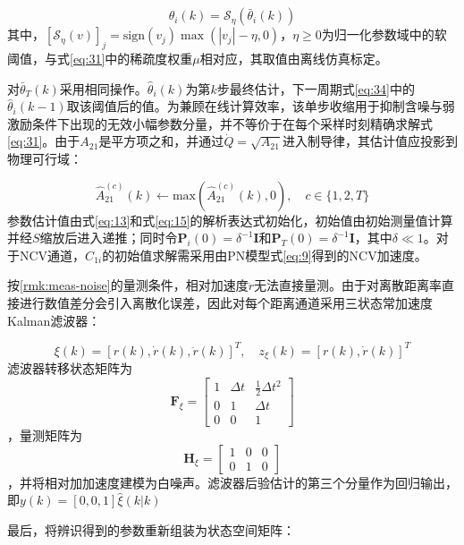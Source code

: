 \begin{equation}
\label{eq:36}
\hat{\theta}_{i}(k) = {\mathcal{S}_\eta }(\bar{\theta}_{i}(k))
\end{equation}
其中，${[{\mathcal{S}_\eta }(v)]_j} = {\text{sign}}({v_j})\max (|{v_j}| - \eta ,0)$，$\eta  \geqslant 0$为归一化参数域中的软阈值，与式\eqref{eq:31}中的稀疏度权重$\mu $相对应，其取值由离线仿真标定。

对$\bar{\theta}_{T}(k)$采用相同操作。$\hat{\theta}_{i}(k)$为第$k$步最终估计，下一周期式\eqref{eq:34}中的$\hat{\theta}_{i}(k - 1)$取该阈值后的值。为兼顾在线计算效率，该单步收缩用于抑制含噪与弱激励条件下出现的无效小幅参数分量，并不等价于在每个采样时刻精确求解式\eqref{eq:31}。由于${A_{21}}$是平方项之和，并通过$\dot Q = \sqrt {{A_{21}}} $进入制导律，其估计值应投影到物理可行域：

\begin{equation}
\label{eq:37}
\hat A_{21}^{(c)}(k) \leftarrow {\text{max}}(\hat A_{21}^{(c)}(k),0),\quad c \in \{ 1,2,T\}
\end{equation}
参数估计值由式\eqref{eq:13}和式\eqref{eq:15}的解析表达式初始化，初始值由初始测量值计算并经$S$缩放后进入递推；同时令${{\mathbf{P}}_i}(0) = {\delta ^{ - 1}}{\mathbf{I}}$和${{\mathbf{P}}_T}(0) = {\delta ^{ - 1}}{\mathbf{I}}$，其中$\delta  \ll 1$。对于NCV通道，${C_{1i}}$的初始值求解需采用由PN模型式\eqref{eq:9}得到的NCV加速度。

按\cref{rmk:meas-noise}的量测条件，相对加速度$\ddot r$无法直接量测。由于对离散距离率直接进行数值差分会引入离散化误差，因此对每个距离通道采用三状态常加速度Kalman滤波器：

\begin{equation}
\label{eq:38}
\xi (k) = {[r(k),\dot r(k),\ddot r(k)]^T},\quad {z_\xi }(k) = {[r(k),\dot r(k)]^T}
\end{equation}
滤波器转移状态矩阵为\[{{\mathbf{F}}_\xi } = \left[ {\begin{array}{*{20}{c}}
  1&{\Delta t}&{\tfrac{1}{2}\Delta {t^2}} \\ 
  0&1&{\Delta t} \\ 
  0&0&1 
\end{array}} \right]\]，量测矩阵为\[{{\mathbf{H}}_\xi } = \begin{bmatrix}
  1 & 0 & 0 \\
  0 & 1 & 0
\end{bmatrix}\]，并将相对加加速度建模为白噪声。滤波器后验估计的第三个分量作为回归输出，即$y(k) = [0,0,1]\hat{\xi}(k|k)$

最后，将辨识得到的参数重新组装为状态空间矩阵：

